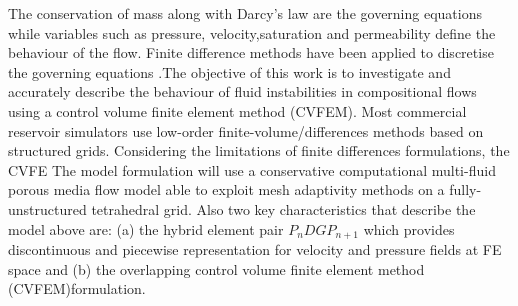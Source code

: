 \documentclass[preprint,authoryear,12pt]{elsarticle}
\begin{document}
The conservation of mass along with Darcy's law are the governing equations while variables such as pressure, velocity,saturation and permeability define the behaviour of the flow. Finite difference methods have been applied to discretise the governing equations \citep{Luo2016,Moortgat2016,Hoteit2008} .The objective of this work is to investigate and accurately describe the behaviour of fluid instabilities in compositional flows using a control volume finite element method (CVFEM). Most commercial reservoir simulators use low-order finite-volume/differences methods based on structured grids. Considering the limitations of finite differences formulations, the CVFE The model formulation will use a conservative computational multi-fluid porous media flow model able to exploit mesh adaptivity methods on a fully-unstructured tetrahedral grid. Also two key characteristics that describe the model above are: (a) the hybrid element pair $P_{n}DGP_{n+1}$ which provides discontinuous and piecewise representation for velocity and pressure fields at FE space and (b) the overlapping control volume finite element method (CVFEM)formulation.
\end{document}
